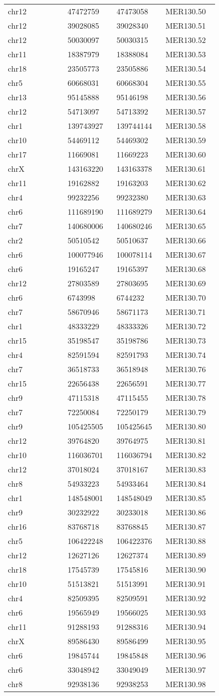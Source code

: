\begin{center}
\begin{longtable}{@{}p{0.25\linewidth}p{0.2\linewidth}p{0.2\linewidth}p{0.2\linewidth}@{}}
chr12 & 47472759 & 47473058 & MER130.50\tabularnewline
chr12 & 39028085 & 39028340 & MER130.51\tabularnewline
chr12 & 50030097 & 50030315 & MER130.52\tabularnewline
chr11 & 18387979 & 18388084 & MER130.53\tabularnewline
chr18 & 23505773 & 23505886 & MER130.54\tabularnewline
chr5 & 60668031 & 60668304 & MER130.55\tabularnewline
chr13 & 95145888 & 95146198 & MER130.56\tabularnewline
chr12 & 54713097 & 54713392 & MER130.57\tabularnewline
chr1 & 139743927 & 139744144 & MER130.58\tabularnewline
chr10 & 54469112 & 54469302 & MER130.59\tabularnewline
chr17 & 11669081 & 11669223 & MER130.60\tabularnewline
chrX & 143163220 & 143163378 & MER130.61\tabularnewline
chr11 & 19162882 & 19163203 & MER130.62\tabularnewline
chr4 & 99232256 & 99232380 & MER130.63\tabularnewline
chr6 & 111689190 & 111689279 & MER130.64\tabularnewline
chr7 & 140680006 & 140680246 & MER130.65\tabularnewline
chr2 & 50510542 & 50510637 & MER130.66\tabularnewline
chr6 & 100077946 & 100078114 & MER130.67\tabularnewline
chr6 & 19165247 & 19165397 & MER130.68\tabularnewline
chr12 & 27803589 & 27803695 & MER130.69\tabularnewline
chr6 & 6743998 & 6744232 & MER130.70\tabularnewline
chr7 & 58670946 & 58671173 & MER130.71\tabularnewline
chr1 & 48333229 & 48333326 & MER130.72\tabularnewline
chr15 & 35198547 & 35198786 & MER130.73\tabularnewline
chr4 & 82591594 & 82591793 & MER130.74\tabularnewline
chr7 & 36518733 & 36518948 & MER130.76\tabularnewline
chr15 & 22656438 & 22656591 & MER130.77\tabularnewline
chr9 & 47115318 & 47115455 & MER130.78\tabularnewline
chr7 & 72250084 & 72250179 & MER130.79\tabularnewline
chr9 & 105425505 & 105425645 & MER130.80\tabularnewline
chr12 & 39764820 & 39764975 & MER130.81\tabularnewline
chr10 & 116036701 & 116036794 & MER130.82\tabularnewline
chr12 & 37018024 & 37018167 & MER130.83\tabularnewline
chr8 & 54933223 & 54933464 & MER130.84\tabularnewline
chr1 & 148548001 & 148548049 & MER130.85\tabularnewline
chr9 & 30232922 & 30233018 & MER130.86\tabularnewline
chr16 & 83768718 & 83768845 & MER130.87\tabularnewline
chr5 & 106422248 & 106422376 & MER130.88\tabularnewline
chr12 & 12627126 & 12627374 & MER130.89\tabularnewline
chr18 & 17545739 & 17545816 & MER130.90\tabularnewline
chr10 & 51513821 & 51513991 & MER130.91\tabularnewline
chr4 & 82509395 & 82509591 & MER130.92\tabularnewline
chr6 & 19565949 & 19566025 & MER130.93\tabularnewline
chr11 & 91288193 & 91288316 & MER130.94\tabularnewline
chrX & 89586430 & 89586499 & MER130.95\tabularnewline
chr6 & 19845744 & 19845848 & MER130.96\tabularnewline
chr6 & 33048942 & 33049049 & MER130.97\tabularnewline
chr8 & 92938136 & 92938253 & MER130.98\tabularnewline

\end{longtable}
\end{center}
